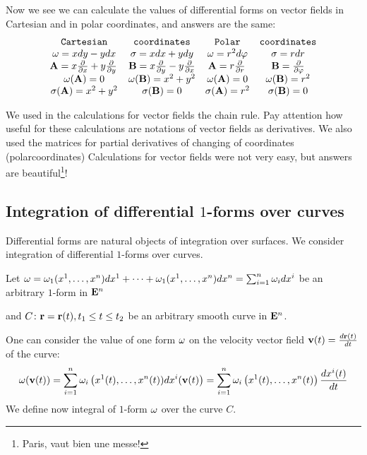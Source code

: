 \documentclass[12pt]{article}
\numberwithin{equation}{section}
\begin{document}
Now we see we can calculate the values of differential forms
on vector fields in Cartesian and in polar coordinates,
and answers are the same:
    \begin{equation}\label{tableofpolarcoordinates}
        \begin{matrix}
        \hbox{\tt Cartesian} & \hbox {\tt coordinates} \cr
        {\omega}=xdy-ydx & \sigma=xdx+ydy \cr
        {\bf A}=x{\partial\over \partial x}+y{\partial\over \partial y}\, &
        {\bf B}=x{\partial\over \partial y}-y{\partial\over \partial x}\cr
      {\omega}({\bf A})=0    &   {\omega}({\bf B})=x^2+y^2\cr
           \sigma({\bf A})=x^2+y^2 & \sigma ({\bf B})=0\cr
         \end{matrix}
          \quad
       \begin{matrix}
        \hbox{\tt Polar} & \hbox {\tt coordinates} \cr
        {\omega}=r^2d\varphi & \sigma=rdr \cr
        {\bf A}=r{\partial\over \partial r}\, &
        {\bf B}={\partial\over \partial \varphi}\cr
      {\omega}({\bf A})=0    &   {\omega}({\bf B})=r^2\cr
           \sigma({\bf A})=r^2& \sigma ({\bf B})=0\cr
         \end{matrix}
    \end{equation}


We used in the calculations for vector fields
 the chain rule. Pay attention how useful for these calculations are notations
of vector fields as derivatives.  We also used the matrices for partial derivatives of changing of coordinates (polarcoordinates) 
 Calculations for vector fields were not very easy, but
answers are beautiful\footnote{ Paris, vaut bien une messe!}! 






\subsection {Integration of differential $1$-forms over curves}
\label{integralofformovercurve}


 
Differential forms are natural objects of integration
over surfaces. We consider integration of differential $1$-forms 
over curves.


Let ${\omega}={\omega}_1(x^1,\dots,x^n)dx^1+\dots+{\omega}_1(x^1,\dots,x^n)dx^n=\sum_{i=1}^n {\omega}_idx^i$
be an arbitrary $1$-form in ${\bf E}^n$

and $C\colon {\bf r}={\bf r}(t), t_1\leq t\leq t_2$ be an arbitrary smooth curve in ${\bf E}^n$.

One can consider the value of one form ${\omega}$ on the velocity vector field ${\bf v}(t)={d{\bf r}(t)\over dt}$ of the curve:
             $$
      {\omega}({\bf v}(t))=\sum_{i=1}^n{\omega}_i\left(x^1(t),\dots,x^n(t))dx^i({\bf v}(t)\right)=
            \sum_{i=1}^n{\omega}_i\left(x^1(t),\dots,x^n(t)\right){d x^i(t)\over dt}
             $$
 We define now integral of $1$-form ${\omega}$ over the curve $C$.
\end{document}
